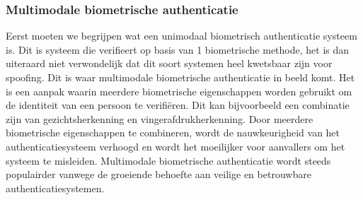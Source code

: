 \subsubsection{Multimodale biometrische authenticatie}%
\label{subsubsec:multimodale-biometrische-authenticatie}
Eerst moeten we begrijpen wat een unimodaal biometrisch authenticatie systeem is. Dit is systeem die verifieert op basis van 1 biometrische methode, het is dan uiteraard niet verwondelijk dat dit soort systemen heel kwetsbaar zijn voor spoofing.
\newline
\newline
Dit is waar multimodale biometrische authenticatie in beeld komt. Het is een aanpak waarin meerdere biometrische eigenschappen worden gebruikt om de identiteit van een persoon te verifiëren. Dit kan bijvoorbeeld een combinatie zijn van gezichtsherkenning en vingerafdrukherkenning. Door meerdere biometrische eigenschappen te combineren, wordt de nauwkeurigheid van het authenticatiesysteem verhoogd en wordt het moeilijker voor aanvallers om het systeem te misleiden. Multimodale biometrische authenticatie wordt steeds populairder vanwege de groeiende behoefte aan veilige en betrouwbare authenticatiesystemen.

